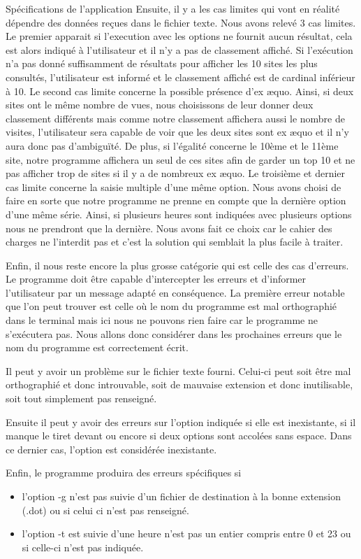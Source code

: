 \documentclass[11pt]{article}
\begin{document}
\begin{section}{Spécifications de l'application}
Ensuite, il y a les cas limites qui vont en réalité dépendre des données reçues dans le fichier texte. Nous avons relevé 3 cas limites. Le premier apparait si l'execution avec les options ne fournit aucun résultat, cela est alors indiqué à l'utilisateur et il n'y a pas de classement affiché. Si l'exécution n'a pas donné suffisamment de résultats pour afficher les 10 sites les plus consultés, l'utilisateur est informé et le classement affiché est de cardinal inférieur à 10. Le second cas limite concerne la possible présence d'ex \ae quo. Ainsi, si deux sites ont le même nombre de vues, nous choisissons de leur donner deux classement différents mais comme notre classement affichera aussi le nombre de visites, l'utilisateur sera capable de voir que les deux sites sont ex \ae quo et il n'y aura donc pas d'ambiguïté. De plus, si l'égalité concerne le 10ème et le 11ème site, notre programme affichera un seul de ces sites afin de garder un top 10 et ne pas afficher trop de sites si il y a de nombreux ex \ae quo. Le troisième et dernier cas limite concerne la saisie multiple d'une même option. Nous avons choisi de faire en sorte que notre programme ne prenne en compte que la dernière option d'une même série. Ainsi, si plusieurs heures sont indiquées avec plusieurs options nous ne prendront que la dernière. Nous avons fait ce choix car le cahier des charges ne l'interdit pas et c'est la solution qui semblait la plus facile à traiter.
 \newline
 
Enfin, il nous reste encore la plus grosse catégorie qui est celle des cas d'erreurs. Le programme doit être capable d'intercepter les erreurs et d'informer l'utilisateur par un message adapté en conséquence.
La première erreur notable que l'on peut trouver est celle où le nom du programme est mal orthographié dans le terminal mais ici nous ne pouvons rien faire car le programme ne s'exécutera pas. Nous allons donc considérer dans les prochaines erreurs que le nom du programme est correctement écrit.

Il peut y avoir un problème sur le fichier texte fourni. Celui-ci peut soit être mal orthographié et donc introuvable, soit de mauvaise extension et donc inutilisable, soit tout simplement pas renseigné. 

Ensuite il peut y avoir des erreurs sur l'option indiquée si elle est inexistante, si il manque le tiret devant ou encore si deux options sont accolées sans espace. Dans ce dernier cas, l'option est considérée inexistante. 

Enfin, le programme produira des erreurs spécifiques si 
\begin{itemize}
\item l'option -g n'est pas suivie d'un fichier de destination à la bonne extension (.dot) ou si celui ci n'est pas renseigné.
\item l'option -t est suivie d'une heure n'est pas un entier compris entre 0 et 23 ou si celle-ci n'est pas indiquée.
\newline
\end{itemize} 




\end{section}
\end{document}
